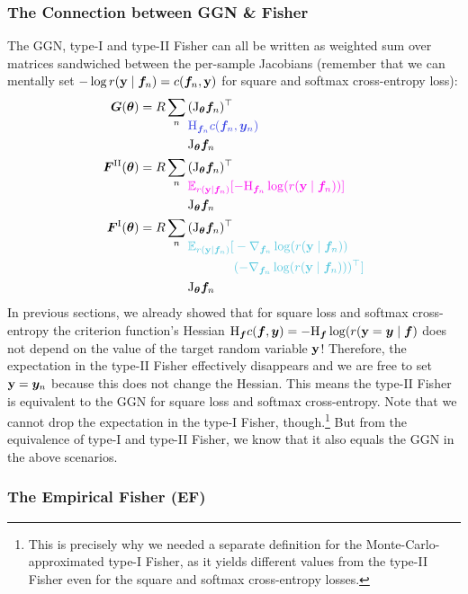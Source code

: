 \subsubsection{The Connection between GGN \& Fisher}\label{subsec:connection-ggn-fisher}
The GGN, type-I and type-II Fisher can all be written as weighted sum over matrices sandwiched between the per-sample Jacobians (remember that we can mentally set $-\log r({\mathbf{y}} \mid {\bm{f}}_n) = c({\bm{f}}_n, {\mathbf{y}})$ for square and softmax cross-entropy loss):
\begin{align*}
  \mG(\vtheta)
   & =
  R \sum_n
  \begin{aligned}[t]
     & (\jac_{\vtheta}\vf_n)^\top                           \\
     & \textcolor{VectorBlue}{\hess_{\vf_n}c(\vf_n, \vy_n)} \\
     & \jac_{\vtheta}\vf_n
  \end{aligned}
  \\
  \mF^{\text{II}}(\vtheta)
   & =
  R \sum_n
  \begin{aligned}[t]
     & (\jac_{\vtheta}\vf_n)^\top                                                                 \\
     & \textcolor{VectorPink}{\E_{r(\rvy \mid \vf_n)}[-\hess_{\vf_n} \log( r(\rvy \mid \vf_n)) ]} \\
     & \jac_{\vtheta}\vf_n
  \end{aligned}
  \\
  \mF^{\text{I}}(\vtheta)
   & =
  R \sum_n
  \begin{aligned}[t]
     & (\jac_{\vtheta}\vf_n)^\top                          \\
     & \textcolor{VectorTeal}{\E_{r(\rvy \mid \vf_n)}[
    \begin{aligned}[t]
       & -\nabla_{\vf_n} \log( r(\rvy \mid \vf_n))           \\
       & (-\nabla_{\vf_n} \log( r(\rvy \mid \vf_n)))^{\top}]
    \end{aligned}} \\
     & \jac_{\vtheta}\vf_n
  \end{aligned}
\end{align*}
In previous sections, we already showed that for square loss and softmax cross-entropy the criterion function's Hessian $\mathrm{H}_{\bm{f}} c({\bm{f}}, {\bm{y}}) = -\mathrm{H}_{{\bm{f}}} \log( r({\mathbf{y}} = {\bm{y}} \mid {\bm{f}})$ does not depend on the value of the target random variable ${\mathbf{y}}$!
Therefore, the expectation in the type-II Fisher effectively disappears and we are free to set ${\mathbf{y}} = {\bm{y}}_n$ because this does not change the Hessian.
This means the type-II Fisher is equivalent to the GGN for square loss and softmax cross-entropy.
Note that we cannot drop the expectation in the type-I Fisher, though.\footnote{This is precisely why we needed a separate definition for the Monte-Carlo-approximated type-I Fisher,
as it yields different values from the type-II Fisher even for the square and softmax cross-entropy losses.}
But from the equivalence of type-I and type-II Fisher, we know that it also equals the GGN in the above scenarios.

\subsubsection{The Empirical Fisher (EF)}\label{sec:emp_fisher}


